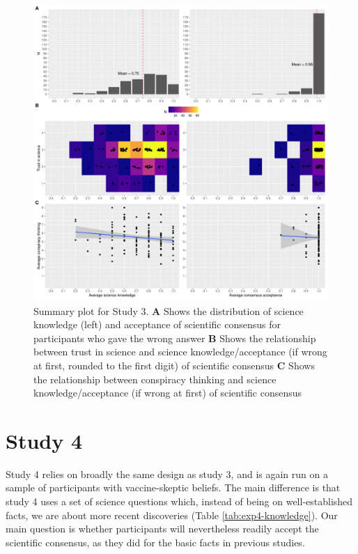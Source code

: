 \documentclass[
  doc,floatsintext]{apa6}
\begin{document}
\begin{figure}
\centering
\includegraphics{output/figures/exp3-plot-overview.pdf}
\caption{\label{fig:exp3-plot-overview}Summary plot for Study 3. \textbf{A} Shows the distribution of science knowledge (left) and acceptance of scientific consensus for participants who gave the wrong answer \textbf{B} Shows the relationship between trust in science and science knowledge/acceptance (if wrong at first, rounded to the first digit) of scientific consensus \textbf{C} Shows the relationship between conspiracy thinking and science knowledge/acceptance (if wrong at first) of scientific consensus}
\end{figure}

\clearpage

\section{Study 4}\label{exp4}

Study 4 relies on broadly the same design as study 3, and is again run on a sample of participants with vaccine-skeptic beliefs. The main difference is that study 4 uses a set of science questions which, instead of being on well-established facts, we are about more recent discoveries (Table \ref{tab:exp4-knowledge}). Our main question is whether participants will nevertheless readily accept the scientific consensus, as they did for the basic facts in previous studies.
\end{document}

